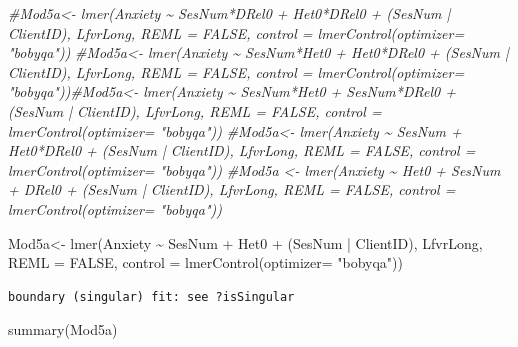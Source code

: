 \documentclass[
  11pt,
]{book}
\newenvironment{Shaded}{\begin{snugshade}}{\end{snugshade}}
\newcommand{\AttributeTok}[1]{\textcolor[rgb]{0.77,0.63,0.00}{#1}}
\newcommand{\CommentTok}[1]{\textcolor[rgb]{0.56,0.35,0.01}{\textit{#1}}}
\newcommand{\ConstantTok}[1]{\textcolor[rgb]{0.00,0.00,0.00}{#1}}
\newcommand{\FunctionTok}[1]{\textcolor[rgb]{0.00,0.00,0.00}{#1}}
\newcommand{\NormalTok}[1]{#1}
\newcommand{\OtherTok}[1]{\textcolor[rgb]{0.56,0.35,0.01}{#1}}
\newcommand{\SpecialCharTok}[1]{\textcolor[rgb]{0.00,0.00,0.00}{#1}}
\newcommand{\StringTok}[1]{\textcolor[rgb]{0.31,0.60,0.02}{#1}}
\begin{document}
\begin{Shaded}
\begin{Highlighting}[]
\CommentTok{\#Mod5a\textless{}{-} lmer(Anxiety \textasciitilde{}  SesNum*DRel0 + Het0*DRel0 + (SesNum | ClientID), LfvrLong, REML = FALSE, control = lmerControl(optimizer= "bobyqa"))}
\CommentTok{\#Mod5a\textless{}{-} lmer(Anxiety \textasciitilde{} SesNum*Het0 +  Het0*DRel0 + (SesNum | ClientID), LfvrLong, REML = FALSE, control = lmerControl(optimizer= "bobyqa"))\#Mod5a\textless{}{-} lmer(Anxiety \textasciitilde{} SesNum*Het0 + SesNum*DRel0 + (SesNum | ClientID), LfvrLong, REML = FALSE, control = lmerControl(optimizer= "bobyqa"))}
\CommentTok{\#Mod5a\textless{}{-} lmer(Anxiety \textasciitilde{} SesNum + Het0*DRel0 + (SesNum | ClientID), LfvrLong, REML = FALSE, control = lmerControl(optimizer= "bobyqa"))}
\CommentTok{\#Mod5a \textless{}{-} lmer(Anxiety \textasciitilde{} Het0 + SesNum + DRel0 + (SesNum | ClientID), LfvrLong, REML = FALSE, control = lmerControl(optimizer= "bobyqa"))}

\NormalTok{Mod5a}\OtherTok{\textless{}{-}} \FunctionTok{lmer}\NormalTok{(Anxiety }\SpecialCharTok{\textasciitilde{}}\NormalTok{ SesNum }\SpecialCharTok{+}\NormalTok{ Het0 }\SpecialCharTok{+}\NormalTok{ (SesNum }\SpecialCharTok{|}\NormalTok{ ClientID), LfvrLong, }\AttributeTok{REML =} \ConstantTok{FALSE}\NormalTok{, }\AttributeTok{control =} \FunctionTok{lmerControl}\NormalTok{(}\AttributeTok{optimizer=} \StringTok{"bobyqa"}\NormalTok{))}
\end{Highlighting}
\end{Shaded}

\begin{verbatim}
boundary (singular) fit: see ?isSingular
\end{verbatim}

\begin{Shaded}
\begin{Highlighting}[]
\FunctionTok{summary}\NormalTok{(Mod5a)}
\end{Highlighting}
\end{Shaded}
\end{document}
